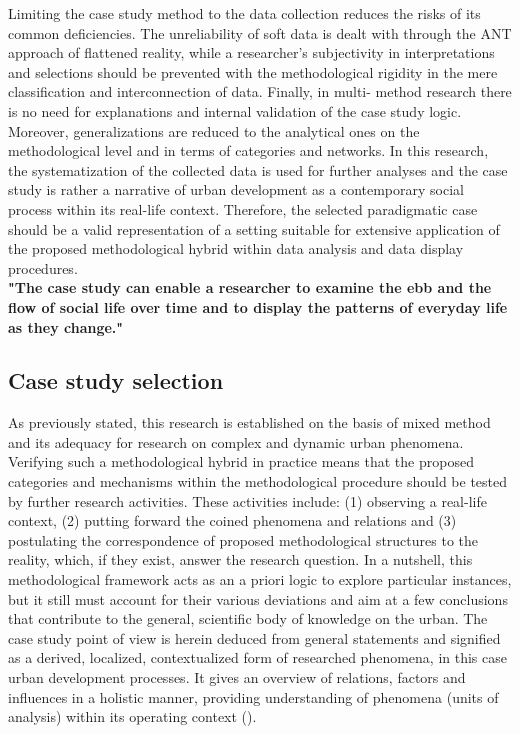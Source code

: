 \documentclass[11pt]{report}
\begin{document}
Limiting the case study method to the data collection reduces the risks of its common deficiencies. The unreliability of soft data is dealt with through the ANT approach of flattened reality, while a researcher’s subjectivity in interpretations and selections should be prevented with the methodological rigidity in the mere classification and interconnection of data. Finally, in multi- method research there is no need for explanations and internal validation of the case study logic. Moreover, generalizations are reduced to the analytical ones on the methodological level and in terms of categories and networks. In this research, the systematization of the collected data is used for further analyses and the case study is rather a narrative of urban development as a contemporary social process within its real-life context. Therefore, the selected paradigmatic case should be a valid representation of a setting suitable for extensive application of the proposed methodological hybrid within data analysis and data display procedures.
\\

\textbf{"The case study can enable a researcher to examine the ebb and the flow of social life over time and to display the patterns of everyday life as they change." \href{Feagin}{\citealt{feagin_case_1991}}}

\subsection{Case study selection}

As previously stated, this research is established on the basis of mixed method and its adequacy for research on complex and dynamic urban phenomena. Verifying such a methodological hybrid in practice means that the proposed categories and mechanisms within the methodological procedure should be tested by further research activities. These activities include: (1) observing a real-life context, (2) putting forward the coined phenomena and relations and (3) postulating the correspondence of proposed methodological structures to the reality, which, if they exist, answer the research question. In a nutshell, this methodological framework acts as an a priori logic to explore particular instances, but it still must account for their various deviations and aim at a few conclusions that contribute to the general, scientific body of knowledge on the urban. The case study point of view is herein deduced from general statements and signified as a derived, localized, contextualized form of researched phenomena, in this case urban development processes. It gives an overview of relations, factors and influences in a holistic manner, providing understanding of phenomena (units of analysis) within its operating context  (\href{Harrison}{\citealt{partington_case_2002}}).
\\
\end{document}
